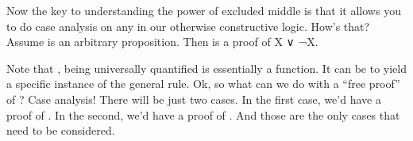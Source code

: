 \documentclass[letterpaper,10pt,english]{sphinxmanual}
\begin{document}
\sphinxAtStartPar
Now the key to understanding the power of excluded middle is
that it allows you to do case analysis on any  in
our otherwise constructive logic. How’s that? Assume  is an
arbitrary proposition. Then  is a proof of X ∨ ¬X.

\sphinxAtStartPar
Note that , being universally quantified is essentially
a function. It can be  to yield a specific instance
of the general rule. Ok, so what can we do with a “free proof”
of ? Case analysis! There will be just two cases. In
the first case, we’d have a proof of . In the second, we’d
have a proof of . And those are the only cases that need
to be considered.
\end{document}
